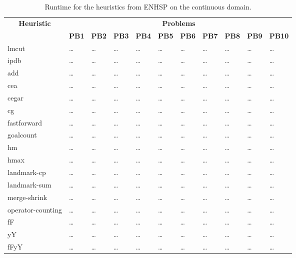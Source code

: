\begin{sidewaystable}
  \centering
  \caption{Runtime for the heuristics from ENHSP on the continuous domain.}\label{tab:continuous-experiment-results}
  \begin{tabular}{p{3cm} *{10}{p{1.523cm}}}
      \toprule
      \multicolumn{1}{c}{\textbf{Heuristic}} & \multicolumn{10}{c}{\textbf{Problems}} \\
      \cmidrule(lr){2-11}
      & \textbf{PB1} & \textbf{PB2} & \textbf{PB3} & \textbf{PB4} & \textbf{PB5} & \textbf{PB6} & \textbf{PB7} & \textbf{PB8} & \textbf{PB9} & \textbf{PB10} \\
      \midrule
      lmcut & \dots & \dots & \dots & \dots & \dots & \dots & \dots & \dots & \dots & \dots \\
      ipdb & \dots & \dots & \dots & \dots & \dots & \dots & \dots & \dots & \dots & \dots \\
      add & \dots & \dots & \dots & \dots & \dots & \dots & \dots & \dots & \dots & \dots \\
      cea & \dots & \dots & \dots & \dots & \dots & \dots & \dots & \dots & \dots & \dots \\
      cegar & \dots & \dots & \dots & \dots & \dots & \dots & \dots & \dots & \dots & \dots \\
      cg & \dots & \dots & \dots & \dots & \dots & \dots & \dots & \dots & \dots & \dots \\
      fastforward & \dots & \dots & \dots & \dots & \dots & \dots & \dots & \dots & \dots & \dots \\
      goalcount & \dots & \dots & \dots & \dots & \dots & \dots & \dots & \dots & \dots & \dots \\
      hm & \dots & \dots & \dots & \dots & \dots & \dots & \dots & \dots & \dots & \dots \\
      hmax & \dots & \dots & \dots & \dots & \dots & \dots & \dots & \dots & \dots & \dots \\
      landmark-cp & \dots & \dots & \dots & \dots & \dots & \dots & \dots & \dots & \dots & \dots \\
      landmark-sum & \dots & \dots & \dots & \dots & \dots & \dots & \dots & \dots & \dots & \dots \\
      merge-shrink & \dots & \dots & \dots & \dots & \dots & \dots & \dots & \dots & \dots & \dots \\
      operator-counting & \dots & \dots & \dots & \dots & \dots & \dots & \dots & \dots & \dots & \dots \\
      fF & \dots & \dots & \dots & \dots & \dots & \dots & \dots & \dots & \dots & \dots \\
      yY & \dots & \dots & \dots & \dots & \dots & \dots & \dots & \dots & \dots & \dots \\
      fFyY & \dots & \dots & \dots & \dots & \dots & \dots & \dots & \dots & \dots & \dots \\
      \bottomrule
  \end{tabular}
\end{sidewaystable}
